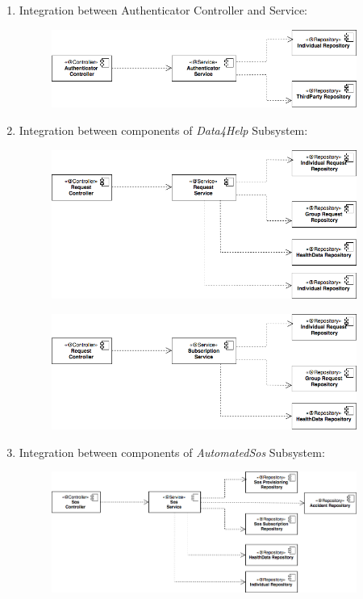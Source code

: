 \documentclass[a4paper]{article}
\begin{document}
\begin{enumerate}

    \item Integration between Authenticator Controller and Service:
    \begin{figure}[!htpb]
    	\centering
    	\includegraphics[width=100mm]{images/test/authenticator_integration.png}
    \end{figure}
    
    \item Integration between components of \textit{Data4Help} Subsystem:
    \begin{figure}[!htpb]
    	\centering
    	\includegraphics[width=100mm]{images/test/data4help_integration.png}
    \end{figure}
    \newpage
    \begin{figure}[!htpb]
    	\centering
    	\includegraphics[width=100mm]{images/test/data4help_subscription_integration.png}
    \end{figure}
    
    \item Integration between components of \textit{AutomatedSos} Subsystem:
    \begin{figure}[!htpb]
    	\centering
    	\includegraphics[width=100mm]{images/test/automated_sos_integration.png}
    \end{figure}
    

\end{enumerate}
\end{document}

